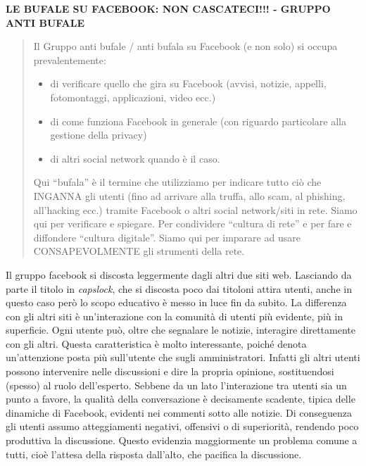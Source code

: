 \documentclass{article}
\begin{document}
\vspace{0.5 cm}

\textbf{LE BUFALE SU FACEBOOK: NON CASCATECI!!! - GRUPPO ANTI BUFALE}

\begin{quote}
Il Gruppo anti bufale / anti bufala su Facebook (e non solo) si occupa prevalentemente:
\begin{itemize}
\item di verificare quello che gira su Facebook (avvisi, notizie, appelli, fotomontaggi, applicazioni, video ecc.)
\item di come funziona Facebook in generale (con riguardo particolare alla gestione della privacy)
\item di altri social network quando è il caso.
\end{itemize}

Qui “bufala” è il termine che utilizziamo per indicare tutto ciò che INGANNA gli utenti (fino ad arrivare alla truffa, allo scam, al phishing, all’hacking ecc.) tramite Facebook o altri social network/siti in rete.
Siamo qui per verificare e spiegare. Per condividere “cultura di rete” e per fare e diffondere “cultura digitale”.
Siamo qui per imparare ad usare CONSAPEVOLMENTE gli strumenti della rete.
\end{quote}

Il gruppo facebook si discosta leggermente dagli altri due siti web. Lasciando da parte il titolo in \textit{capslock}, che si discosta poco dai titoloni attira utenti, anche in questo caso però lo scopo educativo è messo in luce fin da subito. La differenza con gli altri siti è un’interazione con la comunità di utenti più evidente, più in superficie. Ogni utente può, oltre che segnalare le notizie, interagire direttamente con gli altri. Questa caratteristica è molto interessante, poiché denota un’attenzione posta più sull’utente che sugli amministratori. Infatti gli altri utenti possono intervenire nelle discussioni e dire la propria opinione, sostituendosi (spesso) al ruolo dell’esperto. Sebbene da un lato l’interazione tra utenti sia un punto a favore, la qualità della conversazione è decisamente scadente, tipica delle dinamiche di Facebook, evidenti nei commenti sotto alle notizie. Di conseguenza gli utenti assumo atteggiamenti negativi, offensivi o di superiorità, rendendo poco produttiva la discussione.  Questo evidenzia maggiormente un problema comune a tutti, cioè l’attesa della risposta dall’alto, che pacifica la discussione.

\vspace{0.5 cm}
\end{document}
